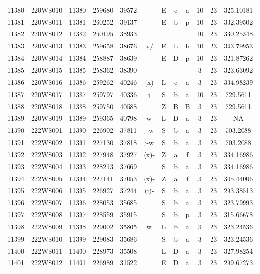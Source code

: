 \begin{tabular}{|*{12}{c|}}
11380 & 220WS010 & 11380 & 259680 & 39572 &  & E & c & a & 10 & 23 & 325.10181 \\ 
11381 & 220WS011 & 11381 & 260252 & 39137 &  & E & b & p & 10 & 23 & 332.39502 \\ 
11382 & 220WS012 & 11382 & 260195 & 38933 &  &  &  &  & 10 & 23 & 330.25348 \\ 
11383 & 220WS013 & 11383 & 259658 & 38676 & w/ & E & b & b & 10 & 23 & 343.79953 \\ 
11384 & 220WS014 & 11384 & 258887 & 38639 &  & E & D & p & 10 & 23 & 321.87262 \\ 
11385 & 220WS015 & 11385 & 258362 & 38390 &  &  &  &  & 3 & 23 & 323.63092 \\ 
11386 & 220WS016 & 11386 & 259262 & 40246 & (x) & L & c & a & 3 & 23 & 334.98239 \\ 
11387 & 220WS017 & 11387 & 259797 & 40336 & j & S & b & a & 10 & 23 & 329.5611 \\ 
11388 & 220WS018 & 11388 & 259750 & 40588 &  & Z & B & B & 3 & 23 & 329.5611 \\ 
11389 & 220WS019 & 11389 & 259365 & 40798 & w & L & D & a & 3 & 23 & NA \\ 
11390 & 222WS001 & 11390 & 226902 & 37811 & j-w & S & b & a & 3 & 23 & 303.2088 \\ 
11391 & 222WS002 & 11391 & 227130 & 37818 & j-w & S & b & a & 3 & 23 & 303.2088 \\ 
11392 & 222WS003 & 11392 & 227948 & 37927 & (x)- & Z & a & f & 3 & 23 & 334.16986 \\ 
11393 & 222WS004 & 11393 & 228213 & 37669 &  & S & b & a & 3 & 23 & 334.16986 \\ 
11394 & 222WS005 & 11394 & 227141 & 37053 & (x)- & Z & a & f & 3 & 23 & 305.44006 \\ 
11395 & 222WS006 & 11395 & 226927 & 37244 & (j)- & S & b & a & 3 & 23 & 293.38513 \\ 
11396 & 222WS007 & 11396 & 228053 & 35685 &  & S & b & a & 3 & 23 & 323.79993 \\ 
11397 & 222WS008 & 11397 & 228559 & 35915 &  & S & b & p & 3 & 23 & 315.66678 \\ 
11398 & 222WS009 & 11398 & 229002 & 35865 & w & L & b & a & 3 & 23 & 323.24536 \\ 
11399 & 222WS010 & 11399 & 229083 & 35686 &  & S & b & a & 3 & 23 & 323.24536 \\ 
11400 & 222WS011 & 11400 & 228973 & 35508 &  & L & D & a & 3 & 23 & 327.98254 \\ 
11401 & 222WS012 & 11401 & 226989 & 31522 &  & E & D & a & 3 & 23 & 299.67273 \\ 

\end{tabular}
